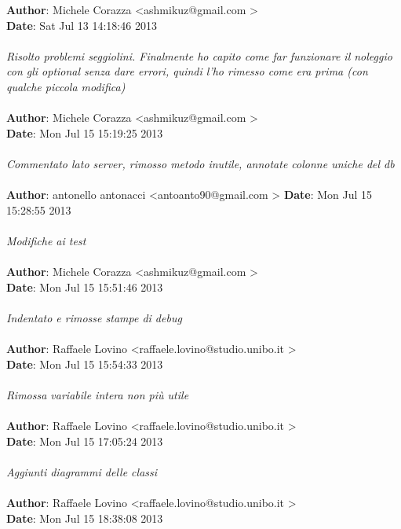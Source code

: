 \documentclass[a4paper,12pt]{article} %
\begin{document}
\textbf{Author}: Michele Corazza \textless ashmikuz@gmail.com \textgreater \\
\textbf{Date}:   Sat Jul 13 14:18:46 2013 \\
\\
    \emph{Risolto problemi seggiolini. Finalmente ho capito come far funzionare il noleggio con gli optional senza dare errori, quindi l'ho 		  rimesso come era prima (con qualche piccola modifica)}\\
\\
\textbf{Author}: Michele Corazza \textless ashmikuz@gmail.com \textgreater \\
\textbf{Date}:   Mon Jul 15 15:19:25 2013 \\
\\
    \emph{Commentato lato server, rimosso metodo inutile, annotate colonne uniche del db}\\
\\
\textbf{Author}: antonello antonacci \textless antoanto90@gmail.com \textgreater
\textbf{Date}:   Mon Jul 15 15:28:55 2013 \\
\\
    \emph{Modifiche ai test}\\
\\
\textbf{Author}: Michele Corazza \textless ashmikuz@gmail.com \textgreater \\
\textbf{Date}:   Mon Jul 15 15:51:46 2013 \\
\\
    \emph{Indentato e rimosse stampe di debug}\\
\\
\textbf{Author}: Raffaele Lovino \textless raffaele.lovino@studio.unibo.it \textgreater \\
\textbf{Date}:   Mon Jul 15 15:54:33 2013 \\
\\
    \emph{Rimossa variabile intera non più utile}\\
\\
\textbf{Author}: Raffaele Lovino \textless raffaele.lovino@studio.unibo.it \textgreater \\
\textbf{Date}:   Mon Jul 15 17:05:24 2013 \\
\\
    \emph{Aggiunti diagrammi delle classi}\\
\\
\textbf{Author}: Raffaele Lovino \textless raffaele.lovino@studio.unibo.it \textgreater \\
\textbf{Date}:   Mon Jul 15 18:38:08 2013 \\
\end{document}
